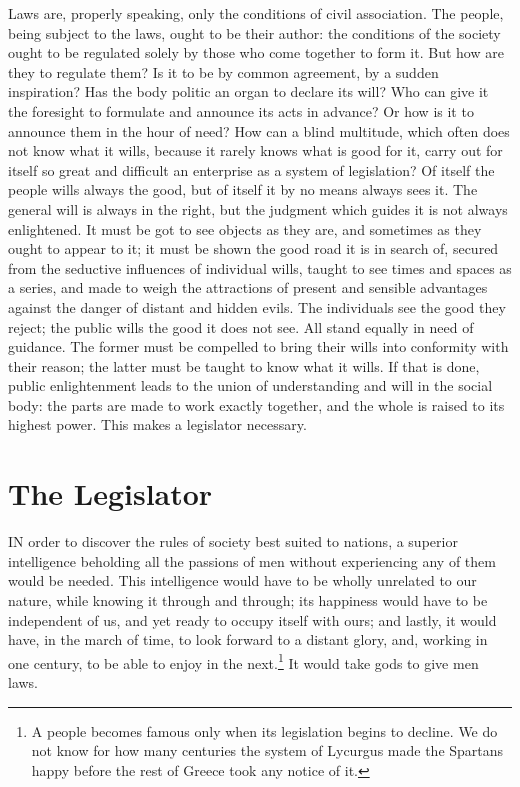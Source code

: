 \documentclass[12pt]{report}
\begin{document}
Laws are, properly speaking, only the conditions of civil association. The people, being subject to the laws, ought to be their author: the conditions of the society ought to be regulated solely by those who come together to form it. But how are they to regulate them? Is it to be by common agreement, by a sudden inspiration? Has the body politic an organ to declare its will? Who can give it the foresight to formulate and announce its acts in advance? Or how is it to announce them in the hour of need? How can a blind multitude, which often does not know what it wills, because it rarely knows what is good for it, carry out for itself so great and difficult an enterprise as a system of legislation? Of itself the people wills always the good, but of itself it by no means always sees it. The general will is always in the right, but the judgment which guides it is not always enlightened. It must be got to see objects as they are, and sometimes as they ought to appear to it; it must be shown the good road it is in search of, secured from the seductive influences of individual wills, taught to see times and spaces as a series, and made to weigh the attractions of present and sensible advantages against the danger of distant and hidden evils. The individuals see the good they reject; the public wills the good it does not see. All stand equally in need of guidance. The former must be compelled to bring their wills into conformity with their reason; the latter must be taught to know what it wills. If that is done, public enlightenment leads to the union of understanding and will in the social body: the parts are made to work exactly together, and the whole is raised to its highest power. This makes a legislator necessary.

\section{The Legislator}
IN order to discover the rules of society best suited to nations, a superior intelligence beholding all the passions of men without experiencing any of them would be needed. This intelligence would have to be wholly unrelated to our nature, while knowing it through and through; its happiness would have to be independent of us, and yet ready to occupy itself with ours; and lastly, it would have, in the march of time, to look forward to a distant glory, and, working in one century, to be able to enjoy in the next.\footnote{A people becomes famous only when its legislation begins to decline. We do not know for how many centuries the system of Lycurgus made the Spartans happy before the rest of Greece took any notice of it.} It would take gods to give men laws.
\end{document}

